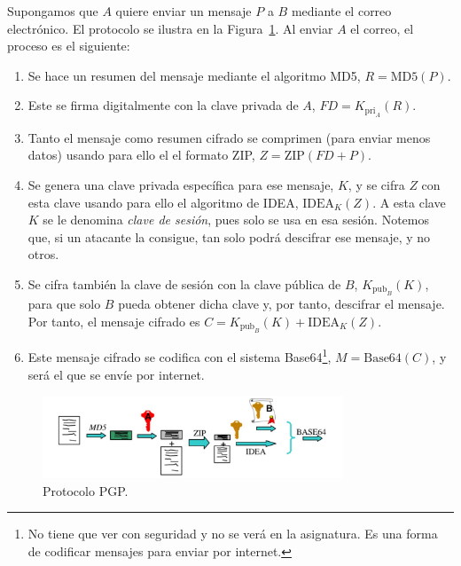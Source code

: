 Supongamos que $A$ quiere enviar un mensaje $P$ a $B$ mediante el correo electrónico. El protocolo se ilustra en la Figura~\ref{fig:pgp}.
Al enviar $A$ el correo, el proceso es el siguiente:
\begin{enumerate}
    \item Se hace un resumen del mensaje mediante el algoritmo \acrshort{MD5}, $R=\text{MD5}(P)$.
    \item Este se firma digitalmente con la clave privada de $A$, $FD=K_{\text{pri}_A}(R)$.
    \item Tanto el mensaje como resumen cifrado se comprimen (para enviar menos datos) usando para ello el el formato ZIP\@, $Z=\text{ZIP}(FD+P)$.
    \item Se genera una clave privada específica para ese mensaje, $K$, y se cifra $Z$ con esta clave usando para ello el algoritmo de \acrshort{IDEA}, $\text{IDEA}_K(Z)$.  A esta clave $K$ se le denomina \emph{clave de sesión}, pues solo se usa en esa sesión. Notemos que, si un atacante la consigue, tan solo podrá descifrar ese mensaje, y no otros.
    \item Se cifra también la clave de sesión con la clave pública de $B$, $K_{\text{pub}_B}(K)$, para que solo $B$ pueda obtener dicha clave y, por tanto, descifrar el mensaje. Por tanto, el mensaje cifrado es $C=K_{\text{pub}_B}(K)+\text{IDEA}_K(Z)$.
    \item Este mensaje cifrado se codifica con el sistema Base64\footnote{No tiene que ver con seguridad y no se verá en la asignatura. Es una forma de codificar mensajes para enviar por internet.}, $M=\text{Base64}(C)$,
    y será el que se envíe por internet.
\end{enumerate}
\begin{figure}
    \centering
    \includegraphics[width=0.8\textwidth]{images/pgp.jpeg}
    \caption{Protocolo \acrshort{PGP}.}
    \label{fig:pgp}
\end{figure}

